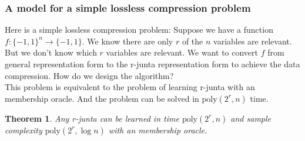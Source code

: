 \documentclass[12pt]{article}
\newtheorem{theorem}{Theorem}
\newcommand{\poly}{\mathrm{poly}}
\begin{document}
\subsubsection{A model for a simple lossless compression problem}

Here is a simple lossless compression problem: Suppose we have a function $f: \{ -1, 1 \}^n \rightarrow \{ -1,1 \}$. We know there are only $r$ of the $n$ variables are relevant. But we don't know which $r$ variables are relevant. We want to convert $f$ from general representation form to the r-junta representation form to achieve the data compression. How do we design the algorithm? \\

This problem is equivalent to the problem of learning r-junta with an membership oracle. And the problem can be solved in $\poly (2^r, n)$ time.

\begin{theorem}
Any r-junta can be learned in time $\poly (2^r, n)$ and sample complexity $\poly (2^r, \log n)$ with an membership oracle.
\end{theorem}
\end{document}
